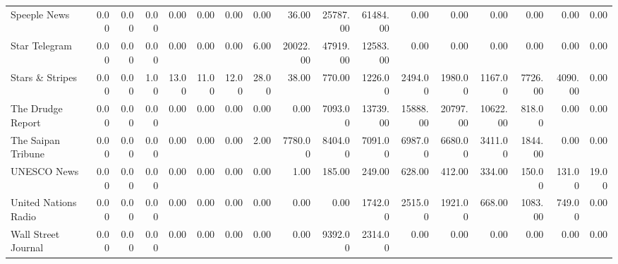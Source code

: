 \begin{table}[ht]
\begin{tabular}{lrrrrrrrrrrrrrrrr}
  Speeple News & 0.00 & 0.00 & 0.00 & 0.00 & 0.00 & 0.00 & 0.00 & 36.00 & 25787.00 & 61484.00 & 0.00 & 0.00 & 0.00 & 0.00 & 0.00 & 0.00 \\ 
  Star Telegram & 0.00 & 0.00 & 0.00 & 0.00 & 0.00 & 0.00 & 6.00 & 20022.00 & 47919.00 & 12583.00 & 0.00 & 0.00 & 0.00 & 0.00 & 0.00 & 0.00 \\ 
  Stars \& Stripes & 0.00 & 0.00 & 1.00 & 13.00 & 11.00 & 12.00 & 28.00 & 38.00 & 770.00 & 1226.00 & 2494.00 & 1980.00 & 1167.00 & 7726.00 & 4090.00 & 0.00 \\ 
  The Drudge Report & 0.00 & 0.00 & 0.00 & 0.00 & 0.00 & 0.00 & 0.00 & 0.00 & 7093.00 & 13739.00 & 15888.00 & 20797.00 & 10622.00 & 818.00 & 0.00 & 0.00 \\ 
  The Saipan Tribune & 0.00 & 0.00 & 0.00 & 0.00 & 0.00 & 0.00 & 2.00 & 7780.00 & 8404.00 & 7091.00 & 6987.00 & 6680.00 & 3411.00 & 1844.00 & 0.00 & 0.00 \\ 
  UNESCO News & 0.00 & 0.00 & 0.00 & 0.00 & 0.00 & 0.00 & 0.00 & 1.00 & 185.00 & 249.00 & 628.00 & 412.00 & 334.00 & 150.00 & 131.00 & 19.00 \\ 
  United Nations Radio & 0.00 & 0.00 & 0.00 & 0.00 & 0.00 & 0.00 & 0.00 & 0.00 & 0.00 & 1742.00 & 2515.00 & 1921.00 & 668.00 & 1083.00 & 749.00 & 0.00 \\ 
  Wall Street Journal & 0.00 & 0.00 & 0.00 & 0.00 & 0.00 & 0.00 & 0.00 & 0.00 & 9392.00 & 2314.00 & 0.00 & 0.00 & 0.00 & 0.00 & 0.00 & 0.00 \\ 
   \hline
\end{tabular}
\end{table}
